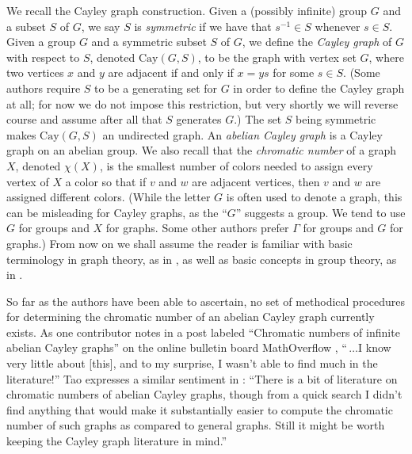 \documentclass{article}
\theoremstyle{definition}
\theoremstyle{remark}
\begin{document}
We recall the Cayley graph construction.  Given a (possibly infinite) group $G$ and a subset $S$ of $G$, we say $S$ is \emph{symmetric} if we have that $s^{-1}\in S$ whenever $s\in S$.    Given a group $G$ and a symmetric subset $S$ of $G$, we define the \emph{Cayley graph} of $G$ with respect to $S$, denoted $\text{Cay}(G,S)$, to be the graph with vertex set $G$, where two vertices $x$ and $y$ are adjacent if and only if $x=ys$ for some $s\in S$.  (Some authors require $S$ to be a generating set for $G$ in order to define the Cayley graph at all; for now we do not impose this restriction, but very shortly we will reverse course and assume after all that $S$ generates $G$.)  The set $S$ being symmetric makes $\text{Cay}(G,S)$ an undirected graph. An \emph{abelian Cayley graph} is a Cayley graph on an abelian group.  We also recall that the \emph{chromatic number} of a graph $X$, denoted $\chi(X)$, is the smallest number of colors needed to assign every vertex of $X$ a color so that if $v$ and $w$ are adjacent vertices, then $v$ and $w$ are assigned different colors.  (While the letter $G$ is often used to denote a graph, this can be misleading for Cayley graphs, as the ``$G$'' suggests a group.  We tend to use $G$ for groups and $X$ for graphs.  Some other authors prefer $\Gamma$ for groups and $G$ for graphs.)  From now on we shall assume the reader is familiar with basic terminology in graph theory, as in \cite{west_introduction_2000}, as well as basic concepts in group theory, as in \cite{Dummit_Foote_2004}.

So far as the authors have been able to ascertain, no set of methodical procedures for determining the chromatic number of an abelian Cayley graph currently exists.  As one contributor notes in a post labeled ``Chromatic numbers of infinite abelian Cayley graphs'' on the online bulletin board MathOverflow \cite{MathOverflow}, ``$\,\dots$I know very little about [this], and to my surprise, I wasn't able to find much in the literature!''  Tao expresses a similar sentiment in \cite{Tao}: ``There is a bit of literature on chromatic numbers of abelian Cayley graphs, though from a quick search I didn’t find anything that would make it substantially easier to compute the chromatic number of such graphs as compared to general graphs. Still it might be worth keeping the Cayley graph literature in mind.''

\vspace{.1in}
\end{document}
